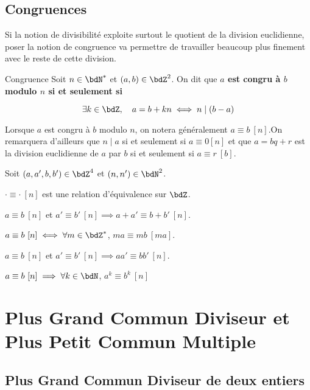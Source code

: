 \documentclass[a4paper,french,bookmarks]{article}
\begin{document}
\subsection{Congruences}

Si la notion de divisibilité exploite surtout le quotient de la division euclidienne, poser la notion de congruence va permettre de travailler beaucoup plus finement avec le reste de cette division.

\begin{definition}{Congruence}{}
    Soit $n \in \bdN^*$ et $(a, b) \in \bdZ^2$. On dit que \bf{$a$ est congru à $b$ modulo $n$} si et seulement si
    
    \[ \exists k \in \bdZ,\quad a = b + kn \iff n \mid (b-a)\]
\end{definition}

Lorsque $a$ est congru à $b$ modulo $n$, on notera généralement $a \equiv b \ [n]$.On remarquera d'ailleurs que $n \mid a$ si et seulement si $a \equiv 0 [n]$ et que $a = bq + r$ est la division euclidienne de $a$ par $b$ si et seulement si $a \equiv r \ [b]$.

\begin{property}{}{}
    Soit $(a, a', b, b') \in \bdZ^4$ et $(n, n') \in \bdN^2$.
    \begin{enumerate}
        \ithand $\cdot \equiv \cdot \ [n]$ est une relation d'équivalence sur $\bdZ$.
        
        \ithand $a \equiv b \ [n]$ et $a' \equiv b' \ [n] \implies a + a' \equiv b + b' \ [n]$.
        
        \ithand $a \equiv b \ [n] \iff \forall m \in \bdZ^*$, \quad $ma \equiv mb \ [ma]$.
        
        \ithand $a \equiv b \ [n]$ et $a' \equiv b' \ [n] \implies aa' \equiv bb' \ [n]$.
        
        \ithand $a \equiv b \ [n] \implies \forall k \in \bdN$, \quad $a^k \equiv b^k \ [n]$
    \end{enumerate}
\end{property}


\section{Plus Grand Commun Diviseur et Plus Petit Commun Multiple}

\subsection{Plus Grand Commun Diviseur de deux entiers}
\end{document}
